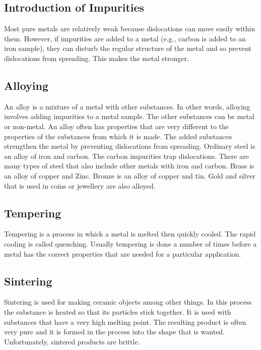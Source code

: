 \subsection*{Introduction of Impurities}
Most pure metals are relatively weak because dislocations can move easily within them. However, if impurities are added to a metal (e.g., carbon is added to an iron sample), they can disturb the regular structure of the metal and so prevent dislocations from spreading. This makes the metal stronger. 
 
\subsection*{Alloying}
An alloy is a mixture of a metal with other substances. In other words, alloying involves adding impurities to a metal sample. The other substances can be metal or non-metal. An alloy often has properties that are very different to the properties of the substances from which it is made. The added substances strengthen the metal by preventing dislocations from spreading. Ordinary steel is an alloy of iron and carbon. The carbon impurities trap dislocations. There are many types of steel that also include other metals with iron and carbon. Brass is an alloy of copper and Zinc. Bronze is an alloy of copper and tin. Gold and silver that is used in coins or jewellery are also alloyed.

\subsection*{Tempering}

Tempering is a process in which a metal is melted then quickly cooled. The rapid cooling is called quenching. Usually tempering is done a number of times before a metal has the correct properties that are needed for a particular application. 

\subsection*{Sintering}

Sintering is used for making ceramic objects among other things. In this process the substance is heated so that its particles stick together. It is used with substances that have a very high melting point. The resulting product is often very pure and it is formed in the process into the shape that is wanted. Unfortunately, sintered products are brittle.

